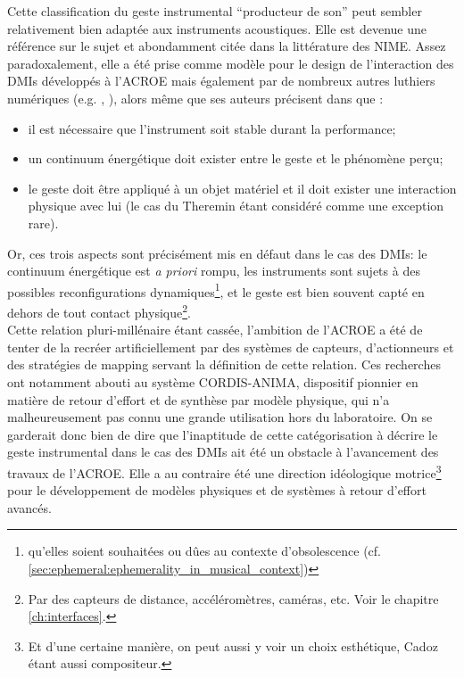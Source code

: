 \noindent Cette classification du geste instrumental ``producteur de son'' peut sembler relativement bien adaptée aux instruments acoustiques. Elle est devenue une référence sur le sujet et abondamment citée dans la littérature des \gls{NIME}. Assez paradoxalement, elle a été prise comme modèle pour le design de l'interaction des \glspl{DMI} développés à l'\gls{ACROE} mais également par de nombreux autres luthiers numériques (e.g. \cite{arfib_strategies_2002}, \cite{schwarz_sound_2012}), alors même que ses auteurs précisent dans \cite{cadoz_geste_1994, cadoz_gesture_2000} que :
\vspace{-1em}
	\begin{itemize}[noitemsep]
		\item il est nécessaire que l'instrument soit stable durant la performance;
		\item un continuum énergétique doit exister entre le geste et le phénomène perçu;
		\item le geste doit être appliqué à un objet matériel et il doit exister une interaction physique avec lui (le cas du Theremin étant considéré comme une exception rare).	
\end{itemize}
\noindent Or, ces trois aspects sont précisément mis en défaut dans le cas des \glspl{DMI}: le continuum énergétique est \textit{a priori} rompu, les instruments sont sujets à des possibles reconfigurations dynamiques\footnote{qu'elles soient souhaitées ou dûes au contexte d'obsolescence (cf. \ref{sec:ephemeral:ephemerality_in_musical_context})}, et le geste est bien souvent capté en dehors de tout contact physique\footnote{Par des capteurs de distance, accéléromètres, caméras, etc. Voir le chapitre \ref{ch:interfaces}.}.\\
\indent Cette relation pluri-millénaire étant cassée, l'ambition de l'\gls{ACROE} a été de tenter de la recréer artificiellement par des systèmes de capteurs, d'actionneurs et des stratégies de mapping servant la définition de cette relation. Ces recherches ont notamment abouti au système \gls{CORDIS-ANIMA}, dispositif pionnier en matière de retour d'effort et de synthèse par modèle physique, qui n'a malheureusement pas connu une grande utilisation hors du laboratoire. On se garderait donc bien de dire que l'inaptitude de cette catégorisation à décrire le geste instrumental dans le cas des \glspl{DMI} ait été un obstacle à l'avancement des travaux de l'\gls{ACROE}. Elle a au contraire été une direction idéologique motrice\footnote{Et d'une certaine manière, on peut aussi y voir un choix esthétique, Cadoz étant aussi compositeur.} pour le développement de modèles physiques et de systèmes à retour d'effort avancés.\\
